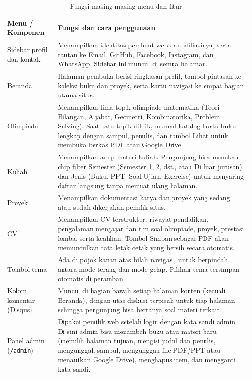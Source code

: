 \documentclass[12pt,a4paper]{article}
\begin{document}
	\begin{table}[h]
		\centering
		\small
		\begin{tabularx}{\textwidth}{@{}>{\raggedright\arraybackslash}p{3.4cm} L@{}}
			\toprule
			\textbf{Menu / Komponen} & \textbf{Fungsi dan cara penggunaan} \\
			\midrule
			Sidebar profil dan kontak & Menampilkan identitas pembuat web dan afiliasinya, serta tautan ke Email, GitHub, Facebook, Instagram, dan WhatsApp. Sidebar ini muncul di semua halaman. \\
			Beranda & Halaman pembuka berisi ringkasan profil, tombol pintasan ke koleksi buku dan proyek, serta kartu navigasi ke empat bagian utama situs. \\
			Olimpiade & Menampilkan lima topik olimpiade matematika (Teori Bilangan, Aljabar, Geometri, Kombinatorika, Problem Solving). Saat satu topik diklik, muncul katalog kartu buku lengkap dengan sampul, penulis, dan tombol Lihat untuk membuka berkas PDF atau Google Drive. \\
			Kuliah & Menampilkan arsip materi kuliah. Pengunjung bisa menekan chip filter Semester (Semester 1, 2, dst., atau Di luar jurusan) dan Jenis (Buku, PPT, Soal Ujian, Exercise) untuk menyaring daftar langsung tanpa memuat ulang halaman. \\
			Proyek & Menampilkan dokumentasi karya dan proyek yang sedang atau sudah dikerjakan pemilik situs. \\
			CV & Menampilkan CV terstruktur: riwayat pendidikan, pengalaman mengajar dan tim soal olimpiade, proyek, prestasi lomba, serta keahlian. Tombol Simpan sebagai PDF akan memunculkan tata letak cetak yang bersih secara otomatis. \\
			Tombol tema & Ada di pojok kanan atas bilah navigasi, untuk berpindah antara mode terang dan mode gelap. Pilihan tema tersimpan otomatis di peramban. \\
			Kolom komentar (Disqus) & Muncul di bagian bawah setiap halaman konten (kecuali Beranda), dengan utas diskusi terpisah untuk tiap halaman sehingga pengunjung bisa bertanya soal materi terkait. \\
			Panel admin (\texttt{/admin}) & Dipakai pemilik web setelah login dengan kata sandi admin. Di sini admin bisa menambah buku atau materi baru (memilih halaman tujuan, mengisi judul dan penulis, mengunggah sampul, mengunggah file PDF/PPT atau menautkan Google Drive), menghapus item, dan mengganti kata sandi. \\
			\bottomrule
		\end{tabularx}
		\caption{Fungsi masing-masing menu dan fitur}
	\end{table}
	
	\medskip
	\noindent{}
	
\end{document}
